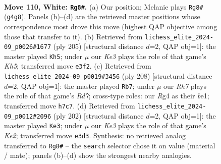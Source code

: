 \documentclass[11pt]{article}
\begin{document}
\clearpage

\begin{figure}[p]\centering
\begin{subfigure}{0.46\textwidth}\centering
\resizebox{\linewidth}{!}{%
\newchessgame
\chessboard[
  setfen={4k3/7R/8/8/6R1/4K3/8/8 w - - 13 110},
  showmover=false,
  pgfstyle=straightmove, color=movearrow, markmove={g4-g8}
]}
\caption{}
\end{subfigure}\hfill
\begin{subfigure}{0.46\textwidth}\centering
\resizebox{\linewidth}{!}{%
\newchessgame
\chessboard[
  setfen={8/7K/8/8/7k/8/6r1/8 b - - 15 103},
  showmover=false,
  pgfstyle=straightmove, color=movearrow, markmove={h4-h5}
]}
\caption{}
\end{subfigure}
\\[4pt]
\begin{subfigure}{0.46\textwidth}\centering
\resizebox{\linewidth}{!}{%
\newchessgame
\chessboard[
  setfen={5k2/3R4/8/5K2/8/8/8/4b3 w - - 9 105},
  showmover=false,
  pgfstyle=straightmove, color=movearrow, markmove={d7-b7}
]}
\caption{}
\end{subfigure}\hfill
\begin{subfigure}{0.46\textwidth}\centering
\resizebox{\linewidth}{!}{%
\newchessgame
\chessboard[
  setfen={2k5/5R2/8/r7/8/8/4K3/8 w - - 81 102},
  showmover=false,
  pgfstyle=straightmove, color=movearrow, markmove={e2-e3}
]}
\caption{}
\end{subfigure}
\caption{\textbf{Move 110, White: \texttt{Rg8\#}.} (a) Our position; Melanie plays \texttt{Rg8\#} (\texttt{g4g8}). Panels (b)--(d) are the retrieved master positions whose correspondence most drove this move (highest QAP objective among those that transfer to it). (b) Retrieved from \texttt{lichess\_elite\_2024-09\_p0026\#1677} (ply 205) [structural distance $d$=2, QAP obj=1]: the master played \texttt{Kh5}; under $\mu$ our \emph{Ke3} plays the role of that game's \emph{Kh5}; transferred move \texttt{e3f2}. (c) Retrieved from \texttt{lichess\_elite\_2024-09\_p0019\#3456} (ply 208) [structural distance $d$=2, QAP obj=1]: the master played \texttt{Rb7}; under $\mu$ our \emph{Rh7} plays the role of that game's \emph{Rd7}; cross-type roles: our \emph{R}g4 as their \emph{b}e1; transferred move \texttt{h7c7}. (d) Retrieved from \texttt{lichess\_elite\_2024-09\_p0012\#2096} (ply 202) [structural distance $d$=2, QAP obj=1]: the master played \texttt{Ke3}; under $\mu$ our \emph{Ke3} plays the role of that game's \emph{Ke2}; transferred move \texttt{e3d3}. Synthesis: no retrieved analog transferred to \texttt{Rg8\#} -- the \texttt{search} selector chose it on value (material / mate); panels (b)--(d) show the strongest nearby analogies.}
\label{fig:thought-m218}
\end{figure}
\end{document}
